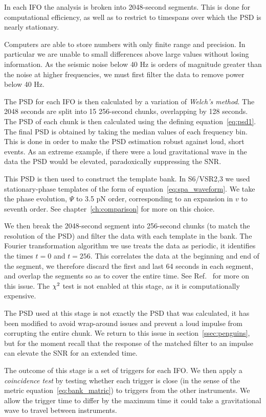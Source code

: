 In each IFO the analysis is broken into 2048-second segments.  This is
done for computational efficiency, as well as to restrict to timespans
over which the PSD is nearly stationary.  

Computers are able to store numbers with only finite range and
precision.  In particular we are unable to small differences above
large values without losing information.  As the seismic noise below
40 Hz is orders of magnitude greater than the noise at higher
frequencies, we must first filter the data to remove power below 40 Hz. 

The PSD for each IFO is then calculated by a variation of
\emph{Welch's method}.  The 2048 seconds are split into 15 256-second
chunks, overlapping by 128 seconds.  The PSD of each chunk is then
calculated using the defining equation~\ref{eq:psd1}.  The final PSD
is obtained by taking the median values of each frequency bin. This is
done in order to make the PSD estimation robust against loud, short
events.  As an extreme example, if there were a loud gravitational
wave in the data the PSD would be elevated, paradoxically suppressing
the SNR. 

This PSD is then used to construct the template bank.  In S6/VSR2,3 we
used stationary-phase templates of the form of
equation~\ref{eq:spa_waveform}.   We take the phase evolution, $\Psi$
to 3.5 pN order, corresponding to an expansion in $v$ to seventh
order.   See chapter~\ref{ch:comparison} for more on this choice.

We then break the 2048-second segment into 256-second chunks (to match
the resolution of the PSD) and filter the data with each template in
the bank.  The Fourier transformation algorithm we use treats the data
as periodic, it identifies the times $t=0$ and $t=256$.  This
correlates the data at the beginning and end of the segment, we
therefore discard the first and last 64 seconds in each segment, and
overlap the segments so as to cover the entire time.  See
Ref.~\cite{DBrownThesis} for more on this issue.  The $\chi^2$ test is
not enabled at this stage, as it is computationally expensive.  

The PSD used at this stage is not exactly the PSD that was calculated,
it has been modified to avoid wrap-around issues and prevent a loud
impulse from corrupting the entire chunk.  We return to this issue in
section~\ref{ssec:penguins}, but for the moment recall that the
response of the matched filter to an impulse can elevate the SNR for
an extended time.

The outcome of this stage is a set of triggers for each IFO.  We then
apply a \emph{coincidence test} by testing whether each trigger is
close (in the sense of the metric equation~\ref{eq:bank_matric}) to
triggers from the other instruments.  We allow the trigger time to
differ by the maximum time it could take a gravitational wave to
travel between instruments.

